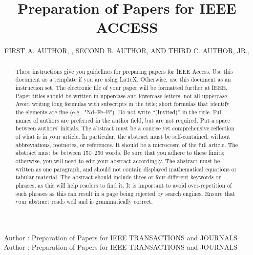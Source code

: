 \documentclass{ieeeaccess}
\begin{document}

\title{Preparation of Papers for IEEE ACCESS}
\author{\uppercase{First A. Author}, ,
\uppercase{Second B. Author, and Third C. Author,
Jr}.,
}
\address[1]{National Institute of Standards and
Technology, Boulder, CO 80305 USA (e-mail: author@boulder.nist.gov)}
\address[2]{Department of Physics, Colorado State University, Fort Collins,
CO 80523 USA (e-mail: author@lamar.colostate.edu)}
\address[3]{Electrical Engineering Department, University of Colorado, Boulder, CO
80309 USA}

\markboth
{Author \headeretal: Preparation of Papers for IEEE TRANSACTIONS and JOURNALS}
{Author \headeretal: Preparation of Papers for IEEE TRANSACTIONS and JOURNALS}


\begin{abstract}
These instructions give you guidelines for preparing papers for
IEEE Access. Use this document as a template if you are
using \LaTeX. Otherwise, use this document as an
instruction set. The electronic file of your paper will be formatted further
at IEEE. Paper titles should be written in uppercase and lowercase letters,
not all uppercase. Avoid writing long formulas with subscripts in the title;
short formulas that identify the elements are fine (e.g., "Nd--Fe--B"). Do
not write ``(Invited)'' in the title. Full names of authors are preferred in
the author field, but are not required. Put a space between authors'
initials. The abstract must be a concise yet comprehensive reflection of
what is in your article. In particular, the abstract must be self-contained,
without abbreviations, footnotes, or references. It should be a microcosm of
the full article. The abstract must be between 150--250 words. Be sure that
you adhere to these limits; otherwise, you will need to edit your abstract
accordingly. The abstract must be written as one paragraph, and should not
contain displayed mathematical equations or tabular material. The abstract
should include three or four different keywords or phrases, as this will
help readers to find it. It is important to avoid over-repetition of such
phrases as this can result in a page being rejected by search engines.
Ensure that your abstract reads well and is grammatically correct.
\end{abstract}
\end{document}
